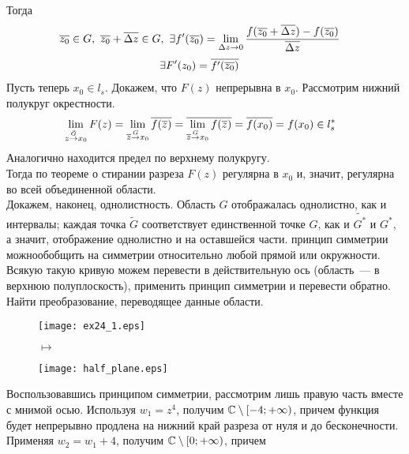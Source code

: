 Тогда
\begin{align*}
  & \overline{z_0} \in G, \ \overline{z_0} +\overline{\Delta z} \in G, \ \exists f'(\overline{z_0}) = \lim_{\Delta z \to 0} \frac{f(\overline{z_0}+\overline{\Delta z}) - f(\overline{z_0})}{\overline{\Delta z}}
\end{align*}
\begin{align*}
  & \exists F'(z_0) = \overline{f'(\overline{z_0})}
\end{align*}
Пусть теперь $x_0 \in l_s$. Докажем, что $F(z)$ непрерывна в $x_0$. Рассмотрим
нижний полукруг окрестности.
\begin{align*}
  & \lim_{z \overset{\tilde{G}}{\to} x_0}F(z) = \lim_{\overline{z} \overset{G}{\to} x_0}\overline{f(\overline{z})} = \overline{\lim_{\overline{z} \overset{G}{\to} x_0}f(\overline{z})} = \overline{f(x_0)} = f(x_0) \in l_s^*
\end{align*}
Аналогично находится предел по верхнему полукругу.
\\
Тогда по теореме о стирании разреза $F(z)$ регулярна в $x_0$ и, значит,
регулярна во всей объединенной области.
\\
Докажем, наконец, однолистность. Область $G$ отображалась однолистно, как и
интервалы; каждая точка $\tilde{G}$ соответствует единственной точке $G$, как и
$\tilde{G^*}$ и $G^*$, а значит, отображение однолистно и на оставшейся части.
\corollary
принцип симметрии можнообобщить на симметрии относительно любой прямой или
окружности.
\pr
Всякую такую кривую можем перевести в действительную ось (область~--- в верхнюю
полуплоскость), применить принцип симметрии и перевести обратно.
\Example
Найти преобразование, переводящее данные области.
\begin{figure}[h!]
    \begin{minipage}[c]{0.45\textwidth}
        \centering
        \texttt{[image: ex24\_1.eps]}
    \end{minipage}
    \begin{minipage}[c]{0.1\textwidth}
        \centering
        \LARGE{$\mapsto$}
    \end{minipage}
    \begin{minipage}[c]{0.45\textwidth}
        \centering
        \texttt{[image: half\_plane.eps]}
    \end{minipage}
    \label{fig:25.1}
\end{figure}
Воспользовавшись принципом симметрии, рассмотрим лишь правую часть вместе с
мнимой осью. Используя $w_1 = z^4$, получим $\mathbb{C} \setminus[-4;+\infty)$, причем
функция будет непрерывно продлена на нижний край разреза от нуля и до
бесконечности. Применяя $w_2 = w_1+4$, получим $\mathbb{C} \setminus[0;+\infty)$, причем
